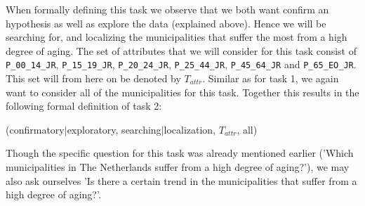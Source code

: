 When formally defining this task we observe that we both want confirm an hypothesis as well as explore the data (explained above). Hence we will be searching for, and localizing the municipalities that suffer the most from a high degree of aging. The set of attributes that we will consider for this task consist of \texttt{P\_00\_14\_JR}, \texttt{P\_15\_19\_JR}, \texttt{P\_20\_24\_JR}, \texttt{P\_25\_44\_JR}, \texttt{P\_45\_64\_JR} and \texttt{P\_65\_EO\_JR}. This set will from here on be denoted by $T_{attr}$. Similar as for task 1, we again want to consider all of the municipalities for this task. Together this results in the following formal definition of task 2:

(confirmatory$|$exploratory, searching$|$localization, $T_{attr}$, all)

Though the specific question for this task was already mentioned earlier ('Which municipalities in The Netherlands suffer from a high degree of aging?'), we may also ask ourselves 'Is there a certain trend in the municipalities that suffer from a high degree of aging?'.
